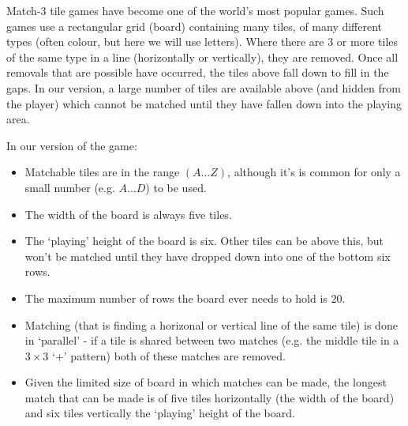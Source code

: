 
Match-3 tile games have become one of the world's most popular games.
Such games use a rectangular grid (board)
containing many tiles, of many different types
(often colour, but here we will use letters). Where there are $3$ or
more tiles of the same type in a line (horizontally or vertically),
they are removed. Once all removals that are possible have occurred,
the tiles above fall down to fill in the gaps. In our version, a large
number of tiles are available above (and hidden from the player) which
cannot be matched until they have fallen down into the playing area.

In our version of the game:
\begin{itemize}
\item Matchable tiles are in the range $(A \ldots Z)$,
although it's is common for only a small
number (e.g. $A \ldots D$) to be used.
\item The width of the board is always five tiles.
\item The `playing' height of the board is six. Other tiles can be above this,
but won't be matched until they have dropped down into one of the bottom six rows.
\item The maximum number of rows the board ever needs to hold is $20$. 
\item Matching (that is finding a horizonal or vertical line of the same tile)
is done in `parallel' - if a tile is shared between two matches
(e.g. the middle tile in a $3\times 3$ `+' pattern) both of these matches are
removed.
\item Given the limited size of board in which matches can be made, the longest
match that can be made is of five tiles horizontally (the width of the board) and
six tiles vertically the `playing' height of the board.
\end{itemize}

